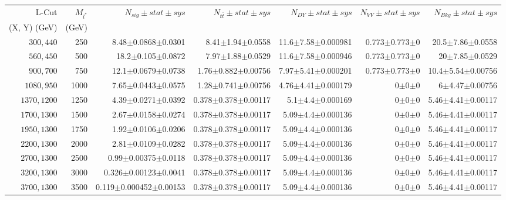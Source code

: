 \documentclass[]{article}
\begin{document}
\begin{table}
\begin{center}
\scriptsize{
\begin{tabular}{ |r|r|r|r|r|r|r|}
\hline 
L-Cut & $M_{l^*}$ & $N_{sig}\pm stat \pm sys $ &$N_{t\bar{t}}\pm stat \pm sys $ & $N_{DY}\pm stat \pm sys $ & $N_{VV}\pm stat \pm sys $ &$N_{Bkg}\pm stat \pm sys$\\
 (X, Y) (GeV) & (GeV) & && &&\\
\hline 
$300, 440$ & 250 & 8.48$\pm$0.0868$\pm$0.0301 & 8.41$\pm$1.94$\pm$0.0558 & 11.6$\pm$7.58$\pm$0.000981 & 0.773$\pm$0.773$\pm$0 & 20.5$\pm$7.86$\pm$0.0558 \\
$560, 450$ & 500 & 18.2$\pm$0.105$\pm$0.0872 & 7.97$\pm$1.88$\pm$0.0529 & 11.6$\pm$7.58$\pm$0.000946 & 0.773$\pm$0.773$\pm$0 & 20$\pm$7.85$\pm$0.0529 \\
$900, 700$ & 750 & 12.1$\pm$0.0679$\pm$0.0738 & 1.76$\pm$0.882$\pm$0.00756 & 7.97$\pm$5.41$\pm$0.000201 & 0.773$\pm$0.773$\pm$0 & 10.4$\pm$5.54$\pm$0.00756 \\
$1080,950$ & 1000 & 7.65$\pm$0.0443$\pm$0.0575 & 1.28$\pm$0.741$\pm$0.00756 & 4.76$\pm$4.41$\pm$0.000179 & 0$\pm$0$\pm$0 & 6$\pm$4.47$\pm$0.00756 \\
$1370,1200$ & 1250 & 4.39$\pm$0.0271$\pm$0.0392 & 0.378$\pm$0.378$\pm$0.00117 & 5.1$\pm$4.4$\pm$0.000169 & 0$\pm$0$\pm$0 & 5.46$\pm$4.41$\pm$0.00117 \\
$1700,1300$ & 1500 & 2.67$\pm$0.0158$\pm$0.0274 & 0.378$\pm$0.378$\pm$0.00117 & 5.09$\pm$4.4$\pm$0.000136 & 0$\pm$0$\pm$0 & 5.46$\pm$4.41$\pm$0.00117 \\
$1950,1300$ & 1750 & 1.92$\pm$0.0106$\pm$0.0206 & 0.378$\pm$0.378$\pm$0.00117 & 5.09$\pm$4.4$\pm$0.000136 & 0$\pm$0$\pm$0 & 5.46$\pm$4.41$\pm$0.00117 \\
$2200,1300$ & 2000 & 2.81$\pm$0.0109$\pm$0.0282 & 0.378$\pm$0.378$\pm$0.00117 & 5.09$\pm$4.4$\pm$0.000136 & 0$\pm$0$\pm$0 & 5.46$\pm$4.41$\pm$0.00117 \\
$2700,1300$ & 2500 & 0.99$\pm$0.00375$\pm$0.0118 & 0.378$\pm$0.378$\pm$0.00117 & 5.09$\pm$4.4$\pm$0.000136 & 0$\pm$0$\pm$0 & 5.46$\pm$4.41$\pm$0.00117 \\
$3200,1300$ & 3000 & 0.326$\pm$0.00123$\pm$0.0041 & 0.378$\pm$0.378$\pm$0.00117 & 5.09$\pm$4.4$\pm$0.000136 & 0$\pm$0$\pm$0 & 5.46$\pm$4.41$\pm$0.00117 \\
$3700,1300$ & 3500 & 0.119$\pm$0.000452$\pm$0.00153 & 0.378$\pm$0.378$\pm$0.00117 & 5.09$\pm$4.4$\pm$0.000136 & 0$\pm$0$\pm$0 & 5.46$\pm$4.41$\pm$0.00117 \\

\end{tabular}}
\end{center}
\end{table}
\end{document}
